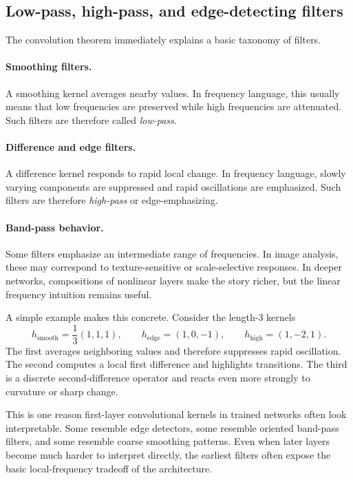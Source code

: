 \subsection*{Low-pass, high-pass, and edge-detecting filters}

The convolution theorem immediately explains a basic taxonomy of filters.

\paragraph{Smoothing filters.}
A smoothing kernel averages nearby values.
In frequency language, this usually means that low frequencies are preserved while high frequencies are attenuated.
Such filters are therefore called \emph{low-pass}.

\paragraph{Difference and edge filters.}
A difference kernel responds to rapid local change.
In frequency language, slowly varying components are suppressed and rapid oscillations are emphasized.
Such filters are therefore \emph{high-pass} or edge-emphasizing.

\paragraph{Band-pass behavior.}
Some filters emphasize an intermediate range of frequencies.
In image analysis, these may correspond to texture-sensitive or scale-selective responses.
In deeper networks, compositions of nonlinear layers make the story richer, but the linear frequency intuition remains useful.

\medskip

A simple example makes this concrete.
Consider the length-$3$ kernels
\[
 h_{\mathrm{smooth}} = \frac{1}{3}(1,1,1),
 \qquad
 h_{\mathrm{edge}} = (1,0,-1),
 \qquad
 h_{\mathrm{high}} = (1,-2,1).
\]
The first averages neighboring values and therefore suppresses rapid oscillation.
The second computes a local first difference and highlights transitions.
The third is a discrete second-difference operator and reacts even more strongly to curvature or sharp change.

\medskip

This is one reason first-layer convolutional kernels in trained networks often look interpretable.
Some resemble edge detectors,
some resemble oriented band-pass filters,
and some resemble coarse smoothing patterns.
Even when later layers become much harder to interpret directly,
the earliest filters often expose the basic local-frequency tradeoff of the architecture.

